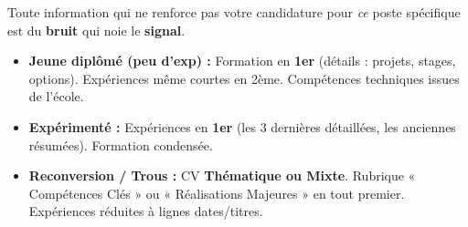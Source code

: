 \documentclass[11pt]{article}
\begin{document}
\begin{propriete}
Toute information qui ne renforce pas votre candidature pour \emph{ce} poste spécifique est du \textbf{bruit} qui noie le \textbf{signal}.
\begin{itemize}
    \item \textbf{Jeune diplômé (peu d'exp) :} Formation en \textbf{1er} (détails : projets, stages, options). Expériences même courtes en 2ème. Compétences techniques issues de l'école.
    \item \textbf{Expérimenté :} Expériences en \textbf{1er} (les 3 dernières détaillées, les anciennes résumées). Formation condensée.
    \item \textbf{Reconversion / Trous :} CV \textbf{Thématique ou Mixte}. Rubrique « Compétences Clés » ou « Réalisations Majeures » en tout premier. Expériences réduites à lignes dates/titres.
\end{itemize}
\end{propriete}
\end{document}
